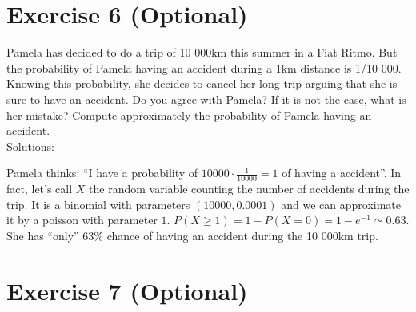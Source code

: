 \documentclass[12pt,thmsa]{article}
\begin{document}
      

\section*{Exercise 6 (Optional)}

Pamela has decided to do a trip of 10 000km this summer in a Fiat Ritmo. But the probability of Pamela having an accident during a 1km distance is 1/10 000.
Knowing this probability, she decides to cancel her long trip arguing that she is sure to have an accident. Do you agree with Pamela?
If it is not the case, what is her mistake? Compute approximately the probability of Pamela having an accident.\\

\noindent Solutions:

Pamela thinks: ``I have a probability of $10 000 \cdot \frac{1}{10 000}=1$ of having a accident''.
In fact, let's call $X$ the random variable counting the number of accidents during the trip.
It is a binomial with parameters $(10 000, 0.0001)$ and we can approximate it by a poisson with parameter $1$.
$P(X \geq 1)=1-P(X=0)=1-e^{-1}\simeq 0.63$.
She has ``only'' 63\% chance of having an accident during the 10 000km trip.

\section*{Exercise 7 (Optional)}
\end{document}
